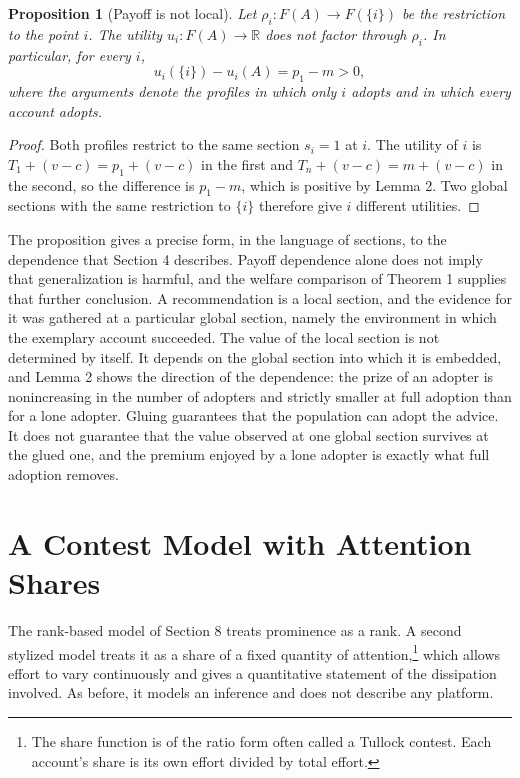\documentclass[12pt]{article}
\theoremstyle{plain}
\newtheorem{proposition}{Proposition}
\theoremstyle{definition}
\begin{document}
\begin{proposition}[Payoff is not local]
Let $\rho_i:F(A)\to F(\{i\})$ be the restriction to the point $i$. The utility $u_i:F(A)\to\mathbb R$ does not factor through $\rho_i$. In particular, for every $i$,
\[
u_i(\{i\})-u_i(A)=p_1-m>0 ,
\]
where the arguments denote the profiles in which only $i$ adopts and in which every account adopts.
\end{proposition}

\begin{proof}
Both profiles restrict to the same section $s_i=1$ at $i$. The utility of $i$ is $T_1+(v-c)=p_1+(v-c)$ in the first and $T_n+(v-c)=m+(v-c)$ in the second, so the difference is $p_1-m$, which is positive by Lemma 2. Two global sections with the same restriction to $\{i\}$ therefore give $i$ different utilities.
\end{proof}

The proposition gives a precise form, in the language of sections, to the dependence that Section 4 describes. Payoff dependence alone does not imply that generalization is harmful, and the welfare comparison of Theorem 1 supplies that further conclusion. A recommendation is a local section, and the evidence for it was gathered at a particular global section, namely the environment in which the exemplary account succeeded. The value of the local section is not determined by itself. It depends on the global section into which it is embedded, and Lemma 2 shows the direction of the dependence: the prize of an adopter is nonincreasing in the number of adopters and strictly smaller at full adoption than for a lone adopter. Gluing guarantees that the population can adopt the advice. It does not guarantee that the value observed at one global section survives at the glued one, and the premium enjoyed by a lone adopter is exactly what full adoption removes.

\section{A Contest Model with Attention Shares}

The rank-based model of Section 8 treats prominence as a rank. A second stylized model treats it as a share of a fixed quantity of attention,\footnote{The share function is of the ratio form often called a Tullock contest. Each account's share is its own effort divided by total effort.} which allows effort to vary continuously and gives a quantitative statement of the dissipation involved. As before, it models an inference and does not describe any platform.
\end{document}
